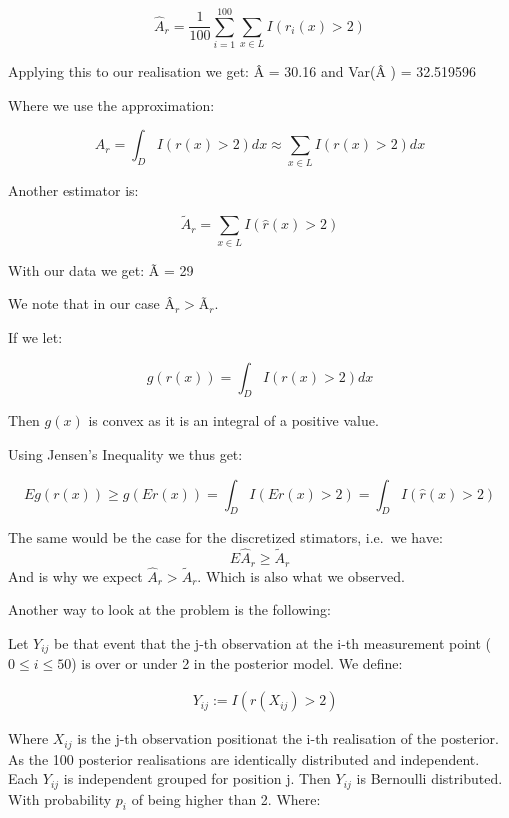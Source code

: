 \documentclass[]{article}
\begin{document}
\begin{equation}
    \hat A_r = \frac{1}{100}\sum_{i=1}^{100}\sum_{x\in L}I(r_i(x)>2)
\end{equation}

Applying this to our realisation we get: Â = 30.16 and Var(Â ) =
32.519596

Where we use the approximation:

\begin{equation}
    A_r = \int_D I(r(x) > 2)dx \approx \sum_{x \in L}I(r(x)>2) dx 
\end{equation}

Another estimator is:

\begin{equation}
    \tilde A_r = \sum_{x \in L} I(\hat r(x) > 2)
\end{equation}

With our data we get: Ã = 29

We note that in our case \(Â_r > Ã_r\).

If we let:

\begin{equation}
    g(r(x)) = \int_D I(r(x) > 2) dx
\end{equation}

Then \(g(x)\) is convex as it is an integral of a positive value.

Using Jensen's Inequality we thus get:

\begin{equation}
 Eg(r(x)) \geq g(Er(x)) = \int_D I(Er(x) > 2) =\int_D I(\hat r(x) > 2)
\end{equation}

The same would be the case for the discretized stimators, i.e.~we have:
\[E\hat A_r \geq \tilde A_r\] And is why we expect
\(\hat A_r > \tilde A_r\). Which is also what we observed.

Another way to look at the problem is the following:

Let \(Y_{ij}\) be that event that the j-th observation at the i-th
measurement point (\(0 \leq i \leq 50\)) is over or under 2 in the
posterior model. We define:

\begin{equation}
    \begin{split}
        & Y_{ij} := I(r(X_{ij})> 2)
    \end{split}
\end{equation}

Where \(X_{ij}\) is the j-th observation positionat the i-th realisation
of the posterior. As the 100 posterior realisations are identically
distributed and independent. Each \(Y_{ij}\) is independent grouped for
position j. Then \(Y_{ij}\) is Bernoulli distributed. With probability
\(p_{i}\) of being higher than 2. Where:
\end{document}
